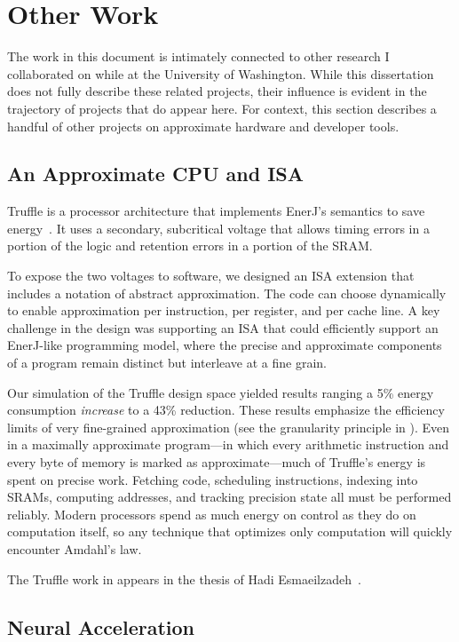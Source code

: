 \section{Other Work}

The work in this document is intimately connected to other research I
collaborated on while at the University of Washington.
While this dissertation does not fully describe these related projects, their
influence is evident in the trajectory of projects that do appear here.
For context, this section describes a handful of other projects on approximate
hardware and developer tools.


\subsection{An Approximate CPU and ISA}

Truffle is a processor architecture that implements EnerJ's semantics to save
energy~\cite{truffle}. It uses a secondary, subcritical voltage that allows timing errors in
a portion of the logic and retention errors in a portion of the SRAM.

To expose the two voltages to software, we
designed an ISA extension that includes a notation of abstract approximation.
The code can choose dynamically to enable approximation
per instruction, per register, and per cache line.
A key challenge in the design was supporting an ISA that could efficiently
support an EnerJ-like programming model, where the precise and approximate
components of a program remain distinct but interleave at a fine grain.

Our simulation of the Truffle design space yielded results ranging a 5\%
energy consumption \emph{increase} to a 43\% reduction.
These results emphasize the efficiency limits of very fine-grained
approximation (see the granularity principle in ).
Even in a maximally approximate program---in which every
arithmetic instruction and every byte of memory is marked as
approximate---much of Truffle's energy is spent on precise work. Fetching
code, scheduling instructions, indexing into SRAMs, computing addresses, and
tracking precision state all must be performed reliably.
Modern processors spend as much energy on
control as they do on computation itself, so any technique that optimizes only
computation will quickly encounter Amdahl's law.

The Truffle work in appears in the thesis of Hadi
Esmaeilzadeh~\cite{hadi-thesis}.


\subsection{Neural Acceleration}


